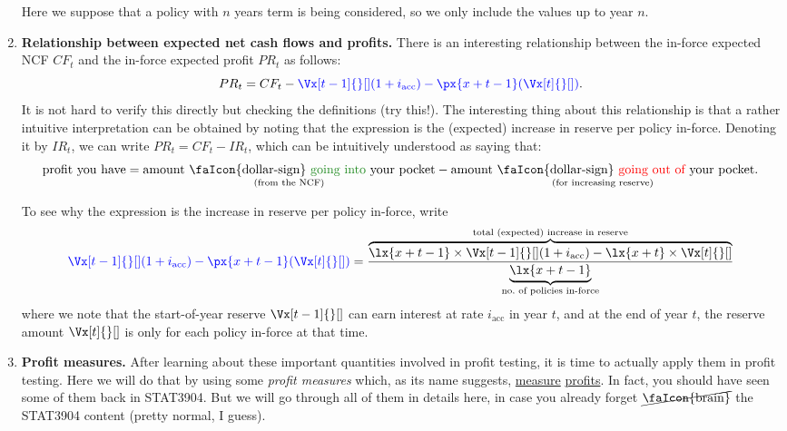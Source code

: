 \begin{enumerate}
\begin{itemize}
\end{itemize}
\begin{note}
Here we suppose that a policy with \(n\) years term is being considered, so we
only include the values up to year \(n\).
\end{note}
\item \textbf{Relationship between expected net cash flows and profits.}
There is an interesting relationship between the in-force expected NCF \(CF_t\)
and the in-force expected profit \(PR_t\) as follows:
\[
PR_t=CF_t-\blc{\Vx[t-1]{}[](1+i_{\mathrm{acc}})-\px{x+t-1}(\Vx[t]{}[])}.
\]
It is not hard to verify this directly but checking the definitions (try
this!). The interesting thing about this relationship is that a rather
intuitive interpretation can be obtained by noting that the 
expression is the (expected) increase in reserve per policy in-force. Denoting
it by \(IR_{t}\), we can write \(\boxed{PR_t=CF_t-IR_{t}}\), which can be
intuitively understood as saying that:
\[
\text{profit you have}
=\underset{\text{(from the NCF)}}{\text{amount \faIcon{dollar-sign} \gc{going into} your pocket}}
-\underset{\text{(for increasing reserve)}}{\text{amount \faIcon{dollar-sign} \rc{going out of} your pocket}}.
\]
\begin{note}
To see why the  expression is the increase in reserve per policy
in-force, write
\[
\blc{\Vx[t-1]{}[](1+i_{\mathrm{acc}})-\px{x+t-1}(\Vx[t]{}[])}
=\frac{\overbrace{\lx{x+t-1}\times \Vx[t-1]{}[](1+i_{\mathrm{acc}})-\lx{x+t}\times \Vx[t]{}[]}^{\text{total (expected) increase in reserve}}}
{\underbrace{\lx{x+t-1}}_{\text{no.\ of policies in-force}}}
\]
where we note that the start-of-year reserve \(\Vx[t-1]{}[]\) can earn interest
at rate \(i_{\mathrm{acc}}\) in year \(t\), and at the end of year \(t\), the
reserve amount \(\Vx[t]{}[]\) is only for each policy in-force at that time.
\end{note}
\item \textbf{Profit measures.} After learning about these important quantities
involved in profit testing, it is time to actually apply them in profit
testing.  Here we will do that by using some \emph{profit measures} which, as
its name suggests, \underline{measure} \underline{profits}. In fact, you should
have seen some of them back in STAT3904. But we will go through all of them in
details here, in case you already forget \(\cancel{\text{\faIcon{brain}}}\) the
STAT3904 content (pretty normal, I guess).


\end{enumerate}
